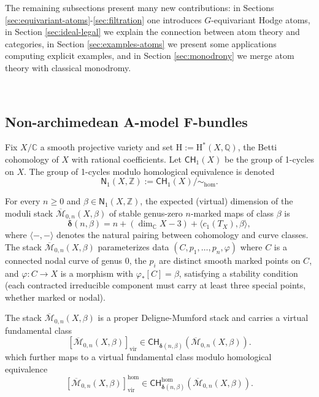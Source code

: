 \documentclass[12pt,a4paper]{amsart}
\theoremstyle{definition}
\theoremstyle{remark}
\newcommand{\Q}{\mathbb{Q}}
\newcommand{\C}{\mathbb{C}}
\begin{document}
The remaining subsections present many new contributions: in Sections \ref{sec:equivariant-atoms}-\ref{sec:filtration} one introduces $G$-equivariant Hodge atoms, in Section \ref{sec:ideal-legal} we explain the connection between atom theory and categories, in Section \ref{sec:examples-atoms} we present some applications computing explicit examples, and in Section \ref{sec:monodrony} we merge atom theory with classical monodromy.

\ 

\subsection{Non-archimedean A-model F-bundles}
\label{sec:A-model}

Fix $X/\C$ a smooth projective variety and set $\mathrm{H}:= \mathrm{H}^\ast(X,\Q)$, the Betti cohomology of $X$ with rational coefficients. Let $\mathsf{CH}_1(X)$ be the group of 1-cycles on $X$. The group of 1-cycles modulo homological equivalence is denoted
\[
\mathsf{N}_1(X,\mathbb Z):=\mathsf{CH}_1(X)/\!\sim_{\mathrm{hom}}.
\]

For every $n\ge 0$ and $\beta\in\mathsf{N}_1(X,\mathbb Z)$, the expected (virtual) dimension of the moduli stack $\overline{\mathcal M}_{0,n}(X,\beta)$ of stable genus-zero $n$-marked maps of class $\beta$ is
\[
\boldsymbol{\delta}(n,\beta)
= n + (\dim_{\mathbb C} X - 3) + \langle c_1(T_X),\beta\rangle,
\]
where $\langle-,-\rangle$ denotes the natural pairing between cohomology and curve classes. The stack $\overline{\mathcal M}_{0,n}(X,\beta)$ parameterizes data $(C,p_1,\dots,p_n,\varphi)$ where $C$ is a connected nodal curve of genus $0$, the $p_i$ are distinct smooth marked points on $C$, and $\varphi: C\to X$ is a morphism with $\varphi_*[C]=\beta$, satisfying a stability condition (each contracted irreducible component must carry at least three special points, whether marked or nodal).

The stack $\overline{\mathcal M}_{0,n}(X,\beta)$ is a proper Deligne-Mumford stack and carries a virtual fundamental class \cites{behrend-fantechi1997,li-tian1998}
\[
[\overline{\mathcal M}_{0,n}(X,\beta)]_{\mathrm{vir}} \in \mathsf{CH}_{\boldsymbol{\delta}(n,\beta)}(\overline{\mathcal M}_{0,n}(X,\beta)).
\]
which further maps to a virtual fundamental class modulo homological equivalence
\[
[\overline{\mathcal M}_{0,n}(X,\beta)]_{\mathrm{vir}}^{\mathrm{hom}} \in \mathsf{CH}_{\boldsymbol{\delta}(n,\beta)}^{\mathrm{hom}} (\overline{\mathcal M}_{0,n}(X,\beta)).
\]
\end{document}
